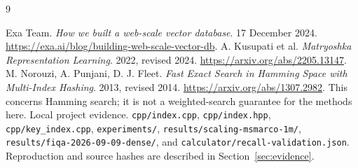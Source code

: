\documentclass[11pt,a4paper]{article}
\begin{document}
\FloatBarrier
{}

\clearpage
\appendix

\begin{thebibliography}{9}\raggedright
{} Exa Team. \emph{How we built a web-scale vector database}. 17 December 2024.
\url{https://exa.ai/blog/building-web-scale-vector-db}.
 A. Kusupati et al. \emph{Matryoshka Representation Learning}. 2022, revised 2024.
\url{https://arxiv.org/abs/2205.13147}.
 M. Norouzi, A. Punjani, D. J. Fleet. \emph{Fast Exact Search in Hamming Space with Multi-Index Hashing}. 2013, revised 2014.
\url{https://arxiv.org/abs/1307.2982}. This concerns Hamming search; it is not a weighted-search guarantee for the methods here.
 Local project evidence. \texttt{cpp/index.cpp}, \texttt{cpp/index.hpp}, \texttt{cpp/key\_index.cpp}, \texttt{experiments/},
\texttt{results/scaling-msmarco-1m/}, \texttt{results/fiqa-2026-09-09-dense/}, and
\texttt{calculator/recall-validation.json}. Reproduction and source hashes are described in Section~\ref{sec:evidence}.
\end{thebibliography}
\end{document}

